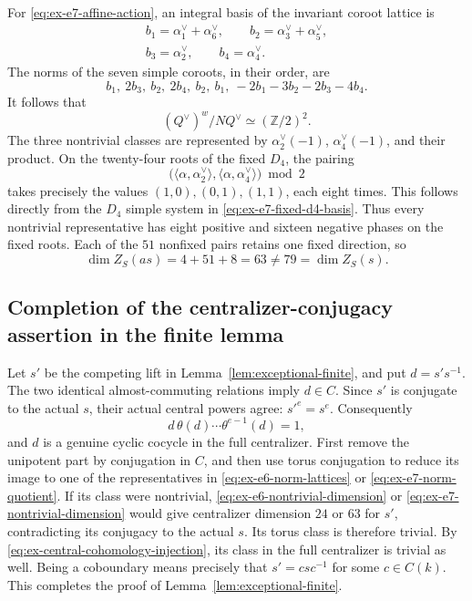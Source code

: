 \documentclass[11pt,a4paper]{article}
\theoremstyle{definition}
\theoremstyle{remark}
\begin{document}
For \eqref{eq:ex-e7-affine-action}, an integral basis of the invariant
coroot lattice is
\begin{equation}\label{eq:ex-e7-invariant-basis}
\begin{gathered}
b_1=\alpha_1^\vee+\alpha_6^\vee,\qquad
b_2=\alpha_3^\vee+\alpha_5^\vee,\\
b_3=\alpha_2^\vee,\qquad b_4=\alpha_4^\vee.
\end{gathered}
\end{equation}
The norms of the seven simple coroots, in their order, are
\begin{equation}\label{eq:ex-e7-norm-columns}
b_1,\ 2b_3,\ b_2,\ 2b_4,\ b_2,\ b_1,\
-2b_1-3b_2-2b_3-4b_4.
\end{equation}
It follows that
\begin{equation}\label{eq:ex-e7-norm-quotient}
(Q^\vee)^w/NQ^\vee\simeq(\mathbb Z/2)^2.
\end{equation}
The three nontrivial classes are represented by
\(\alpha_2^\vee(-1)\), \(\alpha_4^\vee(-1)\), and their product.
On the twenty-four roots of the fixed \(D_4\), the pairing
\[
\bigl(\langle\alpha,\alpha_2^\vee\rangle,
       \langle\alpha,\alpha_4^\vee\rangle\bigr)\bmod2
\]
takes precisely the values \((1,0),(0,1),(1,1)\), each eight times.
This follows directly from the \(D_4\) simple system in
\eqref{eq:ex-e7-fixed-d4-basis}.
Thus every nontrivial representative has eight positive and sixteen
negative phases on the fixed roots.
Each of the \(51\) nonfixed pairs retains one fixed direction, so
\begin{equation}\label{eq:ex-e7-nontrivial-dimension}
\dim Z_S(as)=4+51+8=63\ne79=\dim Z_S(s).
\end{equation}

\subsection{Completion of the centralizer-conjugacy assertion in the finite lemma}
\label{subsec:ex-finite-conjugacy}

Let \(s'\) be the competing lift in Lemma~\ref{lem:exceptional-finite},
and put \(d=s's^{-1}\).
The two identical almost-commuting relations imply \(d\in C\).
Since \(s'\) is conjugate to the actual \(s\), their actual central powers
agree: \(s'^e=s^e\).
Consequently
\begin{equation}\label{eq:ex-genuine-cocycle}
d\,\theta(d)\cdots\theta^{e-1}(d)=1,
\end{equation}
and \(d\) is a genuine cyclic cocycle in the full centralizer.
First remove the unipotent part by conjugation in \(C\), and then use
torus conjugation to reduce its image to one of the representatives in
\eqref{eq:ex-e6-norm-lattices} or \eqref{eq:ex-e7-norm-quotient}.
If its class were nontrivial,
\eqref{eq:ex-e6-nontrivial-dimension} or
\eqref{eq:ex-e7-nontrivial-dimension} would give centralizer dimension
\(24\) or \(63\) for \(s'\), contradicting its conjugacy to the actual \(s\).
Its torus class is therefore trivial.
By \eqref{eq:ex-central-cohomology-injection}, its class in the full
centralizer is trivial as well.
Being a coboundary means precisely that \(s'=csc^{-1}\) for some
\(c\in C(k)\).
This completes the proof of Lemma~\ref{lem:exceptional-finite}.
\end{document}

